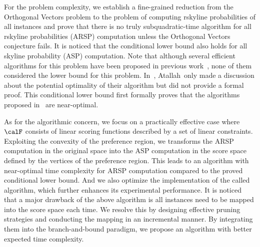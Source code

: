 For the problem complexity, we establish a fine-grained reduction from the Orthogonal Vectors problem to the problem of computing rskyline probabilities of all instances and prove that there is no truly subquadratic-time algorithm for all rskyline probabilities (ARSP) computation unless the Orthogonal Vectors conjecture fails.
It is noticed that the conditional lower bound also holds for all skyline probability (ASP) computation.
Note that although several efficient algorithms for this problem have been proposed in previous work~\cite{DBLP:conf/pods/AtallahQ09, DBLP:journals/tods/AtallahQY11, DBLP:journals/tkde/KimIP12, DBLP:journals/mst/AfshaniAALP13}, none of them considered the lower bound for this problem.
In~\cite{DBLP:journals/tods/AtallahQY11}, Atallah~\etal only made a discussion about the potential optimality of their algorithm but did not provide a formal proof.
This conditional lower bound first formally proves that the algorithms proposed in~\cite{DBLP:conf/pods/AtallahQ09, DBLP:journals/tods/AtallahQY11, DBLP:journals/mst/AfshaniAALP13} are near-optimal.

As for the algorithmic concern, we focus on a practically effective case where $\calF$ consists of linear scoring functions described by a set of linear constraints.
Exploiting the convexity of the preference region, we transforms the ARSP computation in the original space into the ASP computation in the score space defined by the vertices of the preference region.
This leads to an algorithm with near-optimal time complexity for ARSP computation compared to the proved conditional lower bound.
And we also optimize the implementation of the called algorithm, which further enhances its experimental performance.
It is noticed that a major drawback of the above algorithm is all instances need to be mapped into the score space each time.
We resolve this by designing effective pruning strategies and conducting the mapping in an incremental manner.
By integrating them into the branch-and-bound paradigm, we propose an algorithm with better expected time complexity.

